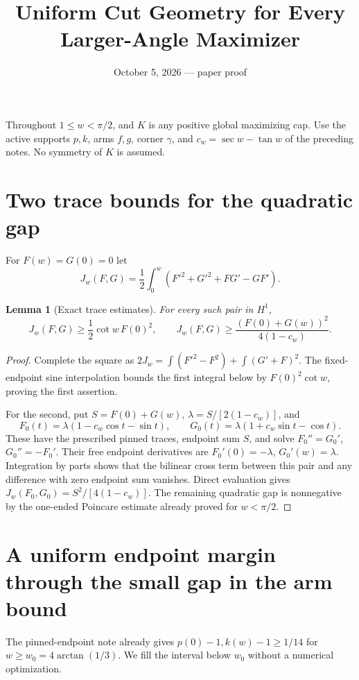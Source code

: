\documentclass[11pt]{article}
\title{Uniform Cut Geometry for Every Larger-Angle Maximizer}
\author{}\date{October 5, 2026 --- paper proof}
\newtheorem{lemma}[theorem]{Lemma}
\begin{document}
\maketitle
Throughout $1\le w<\pi/2$, and $K$ is any positive global maximizing cap. Use the active supports $p,k$, arms $f,g$, corner $\gamma$, and $c_w=\sec w-\tan w$ of the preceding notes. No symmetry of $K$ is assumed.

\section{Two trace bounds for the quadratic gap}
For $F(w)=G(0)=0$ let
\[
 J_w(F,G)=\frac12\int_0^w(F'^2+G'^2+FG'-GF').
\]
\begin{lemma}[Exact trace estimates]\label{lem:trace}
For every such pair in $H^1$,
\[
 J_w(F,G)\ge\frac12\cot w\,F(0)^2,
 \qquad J_w(F,G)\ge\frac{(F(0)+G(w))^2}{4(1-c_w)}.
\]
\end{lemma}
\begin{proof}
Complete the square as $2J_w=\int(F'^2-F^2)+\int(G'+F)^2$. The fixed-endpoint sine interpolation bounds the first integral below by $F(0)^2\cot w$, proving the first assertion.

For the second, put $S=F(0)+G(w)$, $\lambda=S/[2(1-c_w)]$, and
\[
 F_0(t)=\lambda(1-c_w\cos t-\sin t),\qquad
 G_0(t)=\lambda(1+c_w\sin t-\cos t).
\]
These have the prescribed pinned traces, endpoint sum $S$, and solve $F_0''=G_0'$, $G_0''=-F_0'$. Their free endpoint derivatives are $F_0'(0)=-\lambda$, $G_0'(w)=\lambda$. Integration by parts shows that the bilinear cross term between this pair and any difference with zero endpoint sum vanishes. Direct evaluation gives $J_w(F_0,G_0)=S^2/[4(1-c_w)]$. The remaining quadratic gap is nonnegative by the one-ended Poincare estimate already proved for $w<\pi/2$.
\end{proof}

\section{A uniform endpoint margin through the small gap in the arm bound}
The pinned-endpoint note already gives $p(0)-1,k(w)-1\ge1/14$ for $w\ge w_0=4\arctan(1/3)$. We fill the interval below $w_0$ without a numerical optimization.
\end{document}
